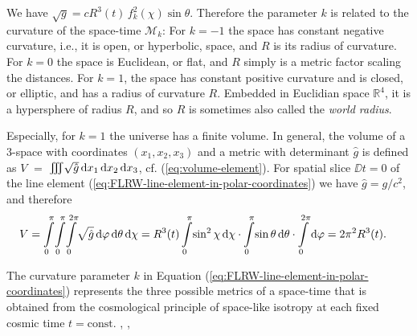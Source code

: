 We have
$ %
	\sqrt{g} = c R^3(t) \, f_k^2(\chi) \sin \theta.
$ %
Therefore the parameter $k$ is related to the curvature of the space-time $\mathscr{M}_k$:
For $k=-1$ the space has constant negative curvature, i.e., it is open, or hyperbolic, space, and $R$ is its radius of curvature.
For $k=0$ the space is Euclidean, or flat, and $R$ simply is a metric factor scaling the distances.
For $k=1$, 
the space has constant positive curvature and is closed, or elliptic, and has a radius of curvature $R$. Embedded in Euclidian space $\mathbb{R}^4$, it is a hypersphere of radius $R$, and so $R$ is sometimes also called the \emph{world radius}.
\cite[pp.~149]{Sexl-Urbantke-1987}

Especially, for $k=1$ the universe has a finite volume. In general, the volume of a 3-space with coordinates $(x_1, x_2, x_3)$ and a metric with determinant $\hat g$ is defined as $V$ $=$ $\iiint \! \sqrt{\hat g} \,\mathrm{d} x_1\,\mathrm{d} x_2 \,\mathrm{d} x_3$, cf. (\ref{eq:volume-element}). For spatial slice $\DD t = 0$ of the line element (\ref{eq:FLRW-line-element-in-polar-coordinates}) we have $\hat g = g / c^2$, and therefore
\begin{align}
	V 
	& = 
	\int\limits_0^\pi \! \int\limits_0^\pi \! \int\limits_0^{2\pi} \! \sqrt{\hat g} \,\mathrm{d} \varphi \,\mathrm{d} \theta \,\mathrm{d} \chi
	=
	R^3(t)  \int\limits_0^\pi \! \sin^2 \chi  \,\mathrm{d} \chi \cdot \int\limits_0^\pi \! \sin \theta   \,\mathrm{d} \theta \cdot \int\limits_0^{2\pi} \! \,\mathrm{d} \varphi
	=
	2 \pi^2 R^3(t).
	\label{eq:FLRW-volume-k=1}
\end{align}

\begin{bem}
The curvature parameter $k$ in Equation (\ref{eq:FLRW-line-element-in-polar-coordinates}) represents the three possible metrics of a space-time that is obtained from the {cosmological principle} of space-like isotropy at each fixed cosmic time $t = \mathrm{const}$. \cite{Hawking-Ellis-1973}, \cite[718-722]{Penrose-2004}\cite[41]{Ryden-2017}, \cite[150]{Sexl-Urbantke-1987}
\end{bem}


